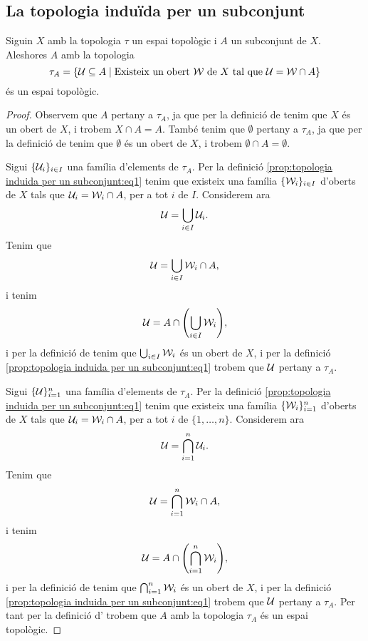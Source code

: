 \documentclass[../Apunts.tex]{subfiles}
\begin{document}
	\subsection{La topologia induïda per un subconjunt}
	\begin{proposition}
		\label{prop:topologia induida per un subconjunt}
		Siguin \(X\) amb la topologia \(\tau\) un espai topològic i \(A\) un subconjunt de \(X\). Aleshores \(A\) amb la topologia
		\begin{equation}
			\label{prop:topologia induida per un subconjunt:eq1}
			\tau_{A}=\{\mathcal{U}\subseteq A\mid\text{Existeix un obert }\mathcal{W}\text{ de }X\text{ tal que }\mathcal{U}=\mathcal{W}\cap A\}
		\end{equation}
		és un espai topològic.
		\begin{proof}
			Observem que \(A\) pertany a \(\tau_{A}\), ja que per la definició de  tenim que \(X\) és un obert de \(X\), i trobem \(X\cap A=A\). També tenim que \(\emptyset\) pertany a \(\tau_{A}\), ja que per la definició de  tenim que \(\emptyset\) és un obert de \(X\), i trobem \(\emptyset\cap A=\emptyset\).
			
			Sigui \(\{\mathcal{U}_{i}\}_{i\in I}\) una família d'elements de \(\tau_{A}\). Per la definició \eqref{prop:topologia induida per un subconjunt:eq1} tenim que existeix una família \(\{\mathcal{W}_{i}\}_{i\in I}\) d'oberts de \(X\) tals que \(\mathcal{U}_{i}=\mathcal{W}_{i}\cap A\), per a tot \(i\) de \(I\). Considerem ara
			\[\mathcal{U}=\bigcup_{i\in I}\mathcal{U}_{i}.\]
			Tenim que
			\[\mathcal{U}=\bigcup_{i\in I}\mathcal{W}_{i}\cap A,\]
			i tenim
			\[\obert{U}=A\cap\left(\bigcup_{i\in I}\obert{W}_{i}\right),\]
			i per la definició de  tenim que \(\bigcup_{i\in I}\mathcal{W}_{i}\) és un obert de \(X\), i per la definició \eqref{prop:topologia induida per un subconjunt:eq1} trobem que \(\mathcal{U}\) pertany a \(\tau_{A}\).
			
			Sigui \(\{\mathcal{U}\}_{i=1}^{n}\) una família d'elements de \(\tau_{A}\). Per la definició \eqref{prop:topologia induida per un subconjunt:eq1} tenim que existeix una família \(\{\mathcal{W}_{i}\}_{i=1}^{n}\) d'oberts de \(X\) tals que \(\mathcal{U}_{i}=\mathcal{W}_{i}\cap A\), per a tot \(i\) de \(\{1,\dots,n\}\). Considerem ara
			\[\mathcal{U}=\bigcap_{i=1}^{n}\mathcal{U}_{i}.\]
			Tenim que
			\[\mathcal{U}=\bigcap_{i=1}^{n}\mathcal{W}_{i}\cap A,\]
			i tenim
			\[\obert{U}=A\cap\left(\bigcap_{i=1}^{n}\obert{W}_{i}\right),\]
			i per la definició de  tenim que \(\bigcap_{i=1}^{n}\mathcal{W}_{i}\) és un obert de \(X\), i per la definició \eqref{prop:topologia induida per un subconjunt:eq1} trobem que \(\mathcal{U}\) pertany a \(\tau_{A}\). Per tant per la definició d' trobem que \(A\) amb la topologia \(\tau_{A}\) és un espai topològic.
		\end{proof}
	\end{proposition}
\end{document}
